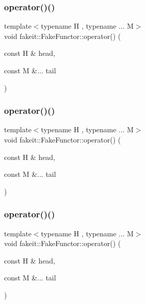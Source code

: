 \subsubsection{\texorpdfstring{operator()()}{operator()()}\hspace{0.1cm}{\footnotesize\ttfamily [3/9]}}
{\footnotesize\ttfamily template$<$typename H , typename ... M$>$ \\
void fakeit\+::\+Fake\+Functor\+::operator() (\begin{DoxyParamCaption}\item[{const H \&}]{head,  }\item[{const M \&...}]{tail }\end{DoxyParamCaption})\hspace{0.3cm}{\ttfamily [inline]}}

\mbox{\label{classfakeit_1_1FakeFunctor_a67158c932fcb480a393e4e6f08af17f1}} 
\subsubsection{\texorpdfstring{operator()()}{operator()()}\hspace{0.1cm}{\footnotesize\ttfamily [4/9]}}
{\footnotesize\ttfamily template$<$typename H , typename ... M$>$ \\
void fakeit\+::\+Fake\+Functor\+::operator() (\begin{DoxyParamCaption}\item[{const H \&}]{head,  }\item[{const M \&...}]{tail }\end{DoxyParamCaption})\hspace{0.3cm}{\ttfamily [inline]}}

\mbox{\label{classfakeit_1_1FakeFunctor_a67158c932fcb480a393e4e6f08af17f1}} 
\subsubsection{\texorpdfstring{operator()()}{operator()()}\hspace{0.1cm}{\footnotesize\ttfamily [5/9]}}
{\footnotesize\ttfamily template$<$typename H , typename ... M$>$ \\
void fakeit\+::\+Fake\+Functor\+::operator() (\begin{DoxyParamCaption}\item[{const H \&}]{head,  }\item[{const M \&...}]{tail }\end{DoxyParamCaption})\hspace{0.3cm}{\ttfamily [inline]}}


